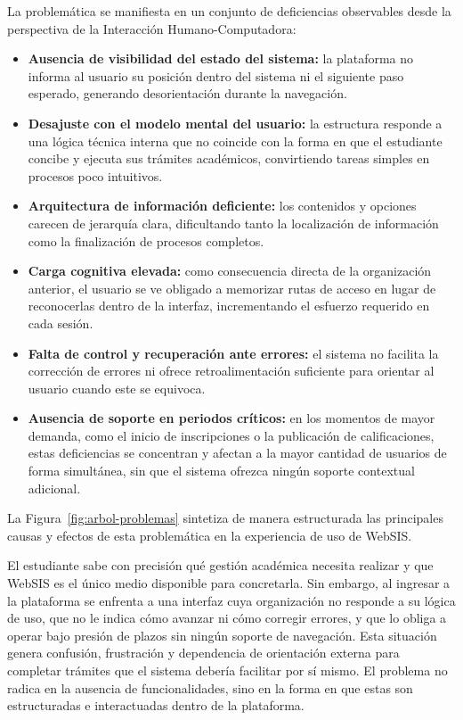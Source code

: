     La problemática se manifiesta en un conjunto de deficiencias observables desde la perspectiva de la Interacción Humano-Computadora:

        \begin{itemize}

            \item \textbf{Ausencia de visibilidad del estado del sistema:} la plataforma no informa al usuario su posición dentro del sistema ni el siguiente paso esperado, generando desorientación durante la navegación.

            \item \textbf{Desajuste con el modelo mental del usuario:} la estructura responde a una lógica técnica interna que no coincide con la forma en que el estudiante concibe y ejecuta sus trámites académicos, convirtiendo tareas simples en procesos poco intuitivos.

            \item \textbf{Arquitectura de información deficiente:} los contenidos y opciones carecen de jerarquía clara, dificultando tanto la localización de información como la finalización de procesos completos.

            \item \textbf{Carga cognitiva elevada:} como consecuencia directa de la organización anterior, el usuario se ve obligado a memorizar rutas de acceso en lugar de reconocerlas dentro de la interfaz, incrementando el esfuerzo requerido en cada sesión.

            \item \textbf{Falta de control y recuperación ante errores:} el sistema no facilita la corrección de errores ni ofrece retroalimentación suficiente para orientar al usuario cuando este se equivoca.

            \item \textbf{Ausencia de soporte en periodos críticos:} en los momentos de mayor demanda, como el inicio de inscripciones o la publicación de calificaciones, estas deficiencias se concentran y afectan a la mayor cantidad de usuarios de forma simultánea, sin que el sistema ofrezca ningún soporte contextual adicional.

        \end{itemize}

    La Figura~\ref{fig:arbol-problemas} sintetiza de manera estructurada las principales causas y efectos de esta problemática en la experiencia de uso de WebSIS.

    

    El estudiante sabe con precisión qué gestión académica necesita realizar y que WebSIS es el único medio disponible para concretarla. Sin embargo, al ingresar a la plataforma se enfrenta a una interfaz cuya organización no responde a su lógica de uso, que no le indica cómo avanzar ni cómo corregir errores, y que lo obliga a operar bajo presión de plazos sin ningún soporte de navegación. Esta situación genera confusión, frustración y dependencia de orientación externa para completar trámites que el sistema debería facilitar por sí mismo. El problema no radica en la ausencia de funcionalidades, sino en la forma en que estas son estructuradas e interactuadas dentro de la plataforma.
